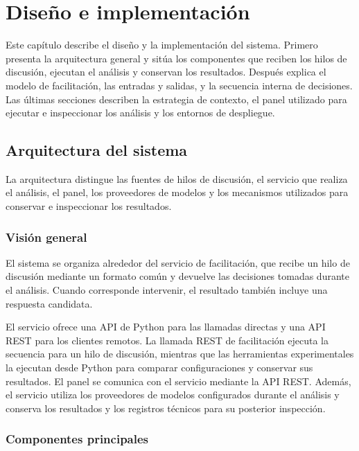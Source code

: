 \chapter{Diseño e implementación}
\label{chap:desarrollo}

Este capítulo describe el diseño y la implementación del sistema. Primero presenta la arquitectura general y sitúa los componentes que reciben los hilos de discusión, ejecutan el análisis y conservan los resultados. Después explica el modelo de facilitación, las entradas y salidas, y la secuencia interna de decisiones. Las últimas secciones describen la estrategia de contexto, el panel utilizado para ejecutar e inspeccionar los análisis y los entornos de despliegue.

\section{Arquitectura del sistema}
\label{sec:arquitectura-sistema}

La arquitectura distingue las fuentes de hilos de discusión, el servicio que realiza el análisis, el panel, los proveedores de modelos y los mecanismos utilizados para conservar e inspeccionar los resultados.

\subsection{Visión general}

El sistema se organiza alrededor del servicio de facilitación, que recibe un hilo de discusión mediante un formato común y devuelve las decisiones tomadas durante el análisis. Cuando corresponde intervenir, el resultado también incluye una respuesta candidata.

El servicio ofrece una API de Python para las llamadas directas y una API REST para los clientes remotos. La llamada REST de facilitación ejecuta la secuencia para un hilo de discusión, mientras que las herramientas experimentales la ejecutan desde Python para comparar configuraciones y conservar sus resultados. El panel se comunica con el servicio mediante la API REST. Además, el servicio utiliza los proveedores de modelos configurados durante el análisis y conserva los resultados y los registros técnicos para su posterior inspección.

\subsection{Componentes principales}

